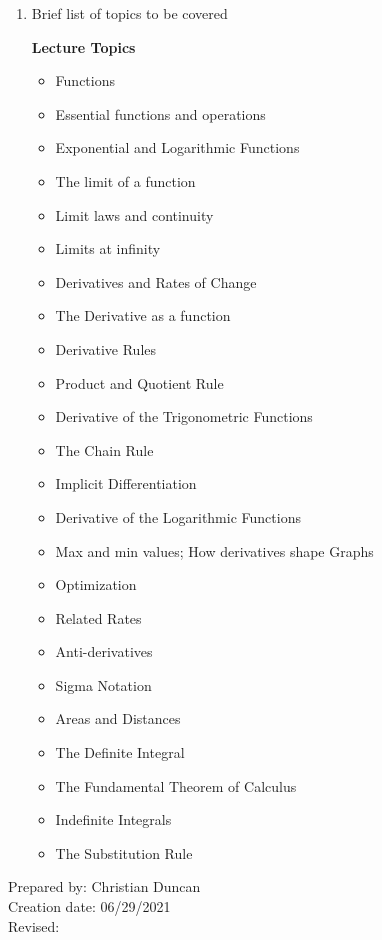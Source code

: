 \begin{enumerate}[1.]
\item Brief list of topics to be covered\\
  {\bfseries
    Lecture Topics
    \begin{itemize}
      \item Functions 
      \item Essential functions and operations
      \item Exponential and Logarithmic Functions
      \item The limit of a function
      \item Limit laws and continuity
      \item Limits at infinity
      \item Derivatives and Rates of Change
      \item The Derivative as a function
      \item Derivative Rules
      \item Product and Quotient Rule
      \item Derivative of the Trigonometric Functions
      \item The Chain Rule
      \item Implicit Differentiation
      \item Derivative of the Logarithmic Functions
      \item Max and min values; How derivatives shape Graphs
      \item Optimization
      \item Related Rates
      \item Anti-derivatives
      \item Sigma Notation
      \item Areas and Distances
      \item The Definite Integral
      \item The Fundamental Theorem of Calculus
      \item Indefinite Integrals
      \item The Substitution Rule
\end{itemize}
  }

\end{enumerate}

\noindent Prepared by: Christian Duncan\\
\noindent Creation date: 06/29/2021\\
\noindent Revised:\\
